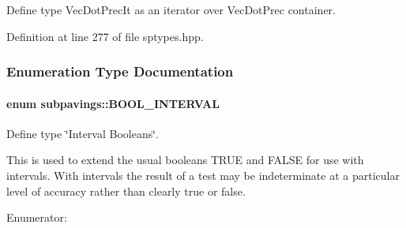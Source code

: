 \-Define type \-Vec\-Dot\-Prec\-It as an iterator over \-Vec\-Dot\-Prec container. 



\-Definition at line 277 of file sptypes.\-hpp.



\subsubsection{\-Enumeration \-Type \-Documentation}
\hypertarget{namespacesubpavings_abf44b15764c504d6ffa87c62b45b01a6}{
\paragraph[{\-B\-O\-O\-L\-\_\-\-I\-N\-T\-E\-R\-V\-A\-L}]{\setlength{\rightskip}{0pt plus 5cm}enum {\bf subpavings\-::\-B\-O\-O\-L\-\_\-\-I\-N\-T\-E\-R\-V\-A\-L}}}\label{namespacesubpavings_abf44b15764c504d6ffa87c62b45b01a6}


\-Define type \char`\"{}\-Interval Booleans\char`\"{}. 

\-This is used to extend the usual booleans \-T\-R\-U\-E and \-F\-A\-L\-S\-E for use with intervals. \-With intervals the result of a test may be indeterminate at a particular level of accuracy rather than clearly true or false. \begin{Desc}
\item[\-Enumerator\-: ]\par
\begin{description}
\item[{\em 
\hypertarget{namespacesubpavings_abf44b15764c504d6ffa87c62b45b01a6a6dc46ce899440df44cb246c8673f77ce}{\-B\-I\-\_\-\-T\-R\-U\-E}\label{namespacesubpavings_abf44b15764c504d6ffa87c62b45b01a6a6dc46ce899440df44cb246c8673f77ce}
}]\item[{\em 
\hypertarget{namespacesubpavings_abf44b15764c504d6ffa87c62b45b01a6af416f80a49e36092e0ce20344f72a226}{\-B\-I\-\_\-\-F\-A\-L\-S\-E}\label{namespacesubpavings_abf44b15764c504d6ffa87c62b45b01a6af416f80a49e36092e0ce20344f72a226}
}]\item[{\em 
\hypertarget{namespacesubpavings_abf44b15764c504d6ffa87c62b45b01a6ad05adf0e5db6a47d94c640a2cbe45eea}{\-B\-I\-\_\-\-I\-N\-D\-E\-T}\label{namespacesubpavings_abf44b15764c504d6ffa87c62b45b01a6ad05adf0e5db6a47d94c640a2cbe45eea}
}]\end{description}
\end{Desc}



